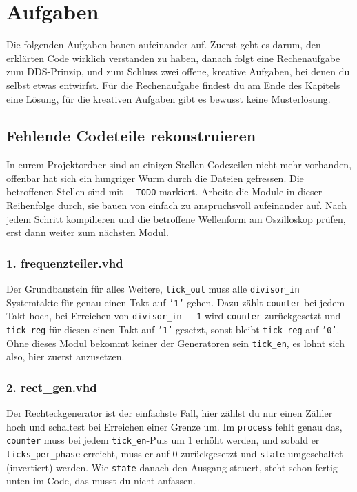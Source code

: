 \chapter{Aufgaben}

Die folgenden Aufgaben bauen aufeinander auf. Zuerst geht es darum, den erklärten Code wirklich verstanden zu haben, danach folgt eine Rechenaufgabe zum DDS-Prinzip, und zum Schluss zwei offene, kreative Aufgaben, bei denen du selbst etwas entwirfst. Für die Rechenaufgabe findest du am Ende des Kapitels eine Lösung, für die kreativen Aufgaben gibt es bewusst keine Musterlösung.

\section{Fehlende Codeteile rekonstruieren}
\label{sec:fehlende-codeteile}

In eurem Projektordner sind an einigen Stellen Codezeilen nicht mehr vorhanden, offenbar hat sich ein hungriger Wurm durch die Dateien gefressen. Die betroffenen Stellen sind mit \texttt{-- TODO} markiert. Arbeite die Module in dieser Reihenfolge durch, sie bauen von einfach zu anspruchsvoll aufeinander auf. Nach jedem Schritt kompilieren und die betroffene Wellenform am Oszilloskop prüfen, erst dann weiter zum nächsten Modul.

\subsection*{1. frequenzteiler.vhd}

Der Grundbaustein für alles Weitere, \texttt{tick\_out} muss alle \texttt{divisor\_in} Systemtakte für genau einen Takt auf \texttt{'1'} gehen. Dazu zählt \texttt{counter} bei jedem Takt hoch, bei Erreichen von \texttt{divisor\_in - 1} wird \texttt{counter} zurückgesetzt und \texttt{tick\_reg} für diesen einen Takt auf \texttt{'1'} gesetzt, sonst bleibt \texttt{tick\_reg} auf \texttt{'0'}. Ohne dieses Modul bekommt keiner der Generatoren sein \texttt{tick\_en}, es lohnt sich also, hier zuerst anzusetzen.

\subsection*{2. rect\_gen.vhd}

Der Rechteckgenerator ist der einfachste Fall, hier zählst du nur einen Zähler hoch und schaltest bei Erreichen einer Grenze um. Im \texttt{process} fehlt genau das, \texttt{counter} muss bei jedem \texttt{tick\_en}-Puls um 1 erhöht werden, und sobald er \texttt{ticks\_per\_phase} erreicht, muss er auf 0 zurückgesetzt und \texttt{state} umgeschaltet (invertiert) werden. Wie \texttt{state} danach den Ausgang steuert, steht schon fertig unten im Code, das musst du nicht anfassen.

